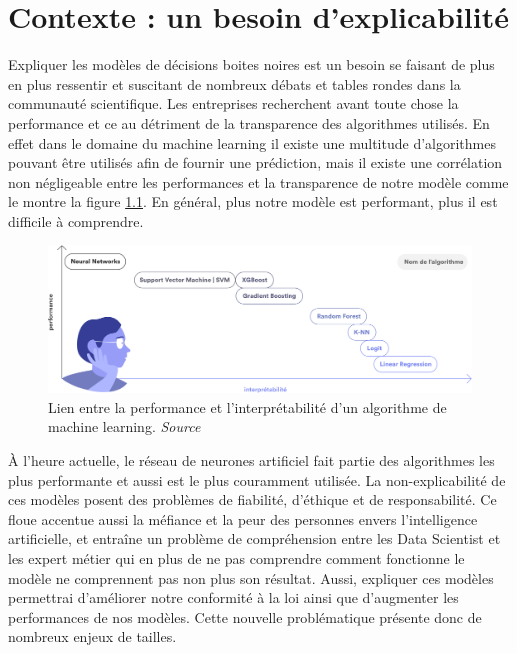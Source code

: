 \chapter{Contexte : un besoin d'explicabilité}
Expliquer les modèles de décisions boites noires est un besoin se faisant de plus en plus ressentir et suscitant de nombreux débats et tables rondes dans la communauté scientifique. Les entreprises recherchent avant toute chose la performance et ce au détriment de la transparence des algorithmes utilisés. En effet dans le domaine du machine learning il existe une multitude d'algorithmes pouvant être utilisés afin de fournir une prédiction, mais il existe une corrélation non négligeable entre les performances et la transparence de notre modèle comme le montre la figure \ref{performanceAndInterpretabilite}. En général, plus notre modèle est performant, plus il est difficile à comprendre.\par

\begin{figure}[h]
\centering
\includegraphics[scale=0.15]{src_img/performanceAndInterpretabilite.png}
\caption{Lien entre la performance et l'interprétabilité d'un algorithme de machine learning. \textit{Source \cite{hippocrate}}}
\label{performanceAndInterpretabilite}
\end{figure}

À l'heure actuelle, le réseau de neurones artificiel fait partie des algorithmes les plus performante et aussi est le plus couramment utilisée.
La non-explicabilité de ces modèles posent des problèmes de fiabilité, d'éthique et de responsabilité. Ce floue accentue aussi la méfiance et la peur des personnes envers l'intelligence artificielle, et entraîne un problème de compréhension entre les Data Scientist et les expert métier qui en plus de ne pas comprendre comment fonctionne le modèle ne comprennent pas non plus son résultat. Aussi, expliquer ces modèles permettrai d'améliorer notre conformité à la loi ainsi que d'augmenter les performances de nos modèles. Cette nouvelle problématique présente donc de nombreux enjeux de tailles.\par

